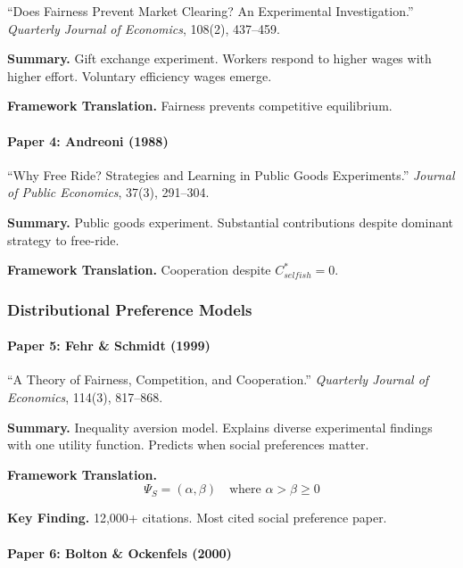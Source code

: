 ``Does Fairness Prevent Market Clearing? An Experimental Investigation.''
\textit{Quarterly Journal of Economics}, 108(2), 437--459.

\textbf{Summary.}
Gift exchange experiment. Workers respond to higher wages with higher effort.
Voluntary efficiency wages emerge.

\textbf{Framework Translation.}
Fairness prevents competitive equilibrium.

\paragraph{Paper 4: Andreoni (1988)}

``Why Free Ride? Strategies and Learning in Public Goods Experiments.''
\textit{Journal of Public Economics}, 37(3), 291--304.

\textbf{Summary.}
Public goods experiment. Substantial contributions despite dominant 
strategy to free-ride.

\textbf{Framework Translation.}
Cooperation despite $C^*_{selfish} = 0$.

\subsubsection{Distributional Preference Models}

\paragraph{Paper 5: Fehr \& Schmidt (1999)}

``A Theory of Fairness, Competition, and Cooperation.''
\textit{Quarterly Journal of Economics}, 114(3), 817--868.

\textbf{Summary.}
Inequality aversion model. Explains diverse experimental findings with 
one utility function. Predicts when social preferences matter.

\textbf{Framework Translation.}
\begin{equation}
\Psi_S = (\alpha, \beta) \quad \text{where } \alpha > \beta \geq 0
\end{equation}

\textbf{Key Finding.}
12,000+ citations. Most cited social preference paper.

\paragraph{Paper 6: Bolton \& Ockenfels (2000)}

